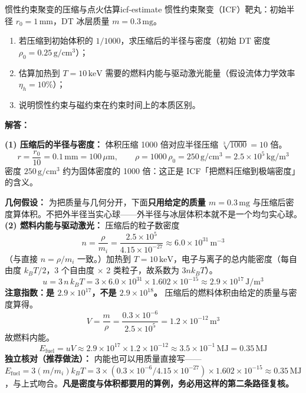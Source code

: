 
\begin{example}{惯性约束聚变的压缩与点火估算}{icf-estimate}
惯性约束聚变（ICF）靶丸：初始半径 $r_0 = 1\,\mathrm{mm}$，DT 冰层质量 $m = 0.3\,\mathrm{mg}$。
\begin{enumerate}[label=(\arabic*)]
\item 若压缩到初始体积的 $1/1000$，求压缩后的半径与密度（初始 DT 密度 $\rho_0 = 0.25\,\mathrm{g/cm^3}$）；
\item 估算加热到 $T=10\,\mathrm{keV}$ 需要的燃料内能与驱动激光能量（假设流体力学效率 $\eta_h = 10\%$）；
\item 说明惯性约束与磁约束在约束时间上的本质区别。
\end{enumerate}
\tcblower
\textbf{解答：}

\textbf{(1) 压缩后的半径与密度：} 体积压缩 1000 倍对应半径压缩 $\sqrt[3]{1000}=10$ 倍。
\[
r = \frac{r_0}{10} = 0.1\,\mathrm{mm} = 100\,\mu\mathrm{m}, \qquad \rho = 1000\,\rho_0 = 250\,\mathrm{g/cm^3} = 2.5\times10^5\,\mathrm{kg/m^3}
\]
密度 $250\,\mathrm{g/cm^3}$ 约为固体密度的 1000 倍：这正是 ICF「把燃料压缩到极端密度」的含义。

\textbf{几何假设：} 为把质量与几何分开，下面\textbf{只用给定的质量 $m=0.3\,\mathrm{mg}$} 与压缩后密度算体积。不把外半径当实心球——外半径与冰层体积本就不是一个均匀实心球。
\textbf{(2) 燃料内能与驱动激光：} 压缩后的粒子数密度
\[
n = \frac{\rho}{m_i} = \frac{2.5\times10^{5}}{4.15\times10^{-27}} \approx 6.0\times10^{31}\,\mathrm{m^{-3}}
\]
（与直接 $n=\rho/m_i$ 一致。）加热到 $T=10\,\mathrm{keV}$，电子与离子的总内能密度（每自由度 $k_{\!B}T/2$，3 个自由度 $\times$ 2 类粒子，故系数为 $3nk_{\!B}T$）。
\[
u = 3\,n\,k_{\!B}T = 3\times6.0\times10^{31}\times1.602\times10^{-15}
\approx 2.9\times10^{17}\,\mathrm{J/m^3}
\]
\textbf{注意指数：是 $2.9\times10^{17}$，不是 $2.9\times10^{18}$。} 压缩后的燃料体积由给定的质量与密度算得。
\[
V = \frac{m}{\rho} = \frac{0.3\times10^{-6}}{2.5\times10^{5}} = 1.2\times10^{-12}\,\mathrm{m^3}
\]
故燃料内能。
\[
E_{\text{fuel}} = uV \approx 2.9\times10^{17}\times1.2\times10^{-12} \approx 3.5\times10^{-1}\,\mathrm{MJ} = 0.35\,\mathrm{MJ}
\]
\textbf{独立核对（推荐做法）：} 内能也可以用质量直接写——$E_{\text{fuel}}=3(m/m_i)k_{\!B}T=3\times(0.3\times10^{-6}/4.15\times10^{-27})\times1.602\times10^{-15}\approx0.35\,\mathrm{MJ}$，与上式吻合。\textbf{凡是密度与体积都要用的算例，务必用这样的第二条路径复核。}


\end{example}
